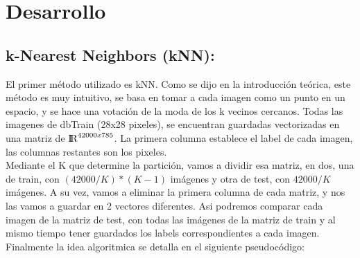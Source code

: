 \section{Desarrollo}
\subsection{k-Nearest Neighbors (kNN):}
El primer método utilizado es kNN. Como se dijo en la introducción teórica, este método es muy intuitivo, se basa en tomar a cada imagen como un punto en un espacio, y se hace una votación de la moda de los k vecinos cercanos. Todas las imagenes de dbTrain (28x28 pixeles), se encuentran guardadas vectorizadas en una matriz de ${\rm I\!R}^{42000x785}$. La primera columna establece el label de cada imagen, las columnas restantes son los pixeles.\\
Mediante el K que determine la partición, vamos a dividir esa matriz, en dos, una de train, con $(42000/K)*(K-1)$ imágenes y otra de test, con $42000/K$ imágenes. A su vez, vamos a eliminar la primera columna de cada matriz, y nos las vamos a guardar en 2 vectores diferentes. Asi podremos comparar cada imagen de la matriz de test, con todas las imágenes de la matriz de train y al mismo tiempo tener guardados los labels correspondientes a cada imagen. Finalmente la idea algoritmica se detalla en el siguiente pseudocódigo:\\
